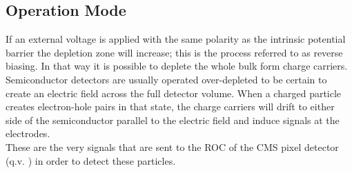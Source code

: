 \documentclass[british,11pt,a4paper]{memoir}
\begin{document}
\subsection{Operation Mode}
If an external voltage is applied with the same polarity as the intrinsic potential barrier the depletion zone will increase; this is the process referred to as reverse biasing. In that way it is possible to deplete the whole bulk form charge carriers. Semiconductor detectors are usually operated over-depleted to be certain to create an electric field across the full detector volume. When a charged particle creates electron-hole pairs in that state, the charge carriers will drift to either side of the semiconductor parallel to the electric field and induce signals at the electrodes.\\
These are the very signals that are sent to the \ac{ROC} of the \ac{CMS} pixel detector (q.v. ) in order to detect these particles.
\end{document}

